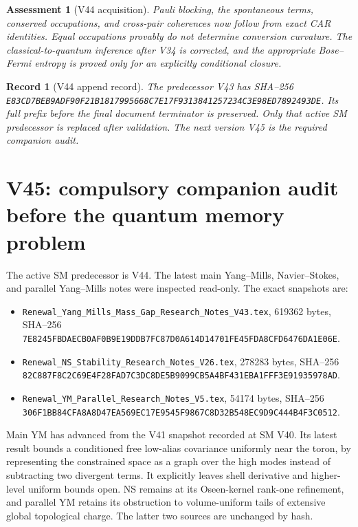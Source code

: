 \documentclass[11pt]{article}
\newtheorem{assessment}[theorem]{Assessment}
\newtheorem{record}[theorem]{Record}
\theoremstyle{remark}
\begin{document}
\begin{assessment}[V44 acquisition]
\label{ass:v20v44}
Pauli blocking, the spontaneous terms, conserved occupations, and
cross-pair coherences now follow from exact CAR identities.
Equal occupations provably do not determine conversion curvature.
The classical-to-quantum inference after V34 is corrected, and the
appropriate Bose--Fermi entropy is proved only for an explicitly
conditional closure.
\end{assessment}

\begin{record}[V44 append record]
\label{rec:v20v44}
The predecessor V43 has SHA--256
\texttt{E83CD7BEB9ADF90F21B1817995668C7E17F9313841257234C3E98ED7892493DE}.
Its full prefix before the final document terminator is preserved.
Only that active SM predecessor is replaced after validation.
The next version V45 is the required companion audit.
\end{record}



\section{V45: compulsory companion audit before the quantum memory problem}
\label{sec:v20v45}

The active SM predecessor is V44.  The latest main Yang--Mills,
Navier--Stokes, and parallel Yang--Mills notes were inspected read-only.
The exact snapshots are:
\begin{itemize}
\item \texttt{Renewal\_Yang\_Mills\_Mass\_Gap\_Research\_Notes\_V43.tex},
619362 bytes, SHA--256
\texttt{7E8245FBDAECB0AF0B9E19DDB7FC87D0A614D14701FE45FDA8CFD6476DA1E06E}.
\item \texttt{Renewal\_NS\_Stability\_Research\_Notes\_V26.tex},
278283 bytes, SHA--256
\texttt{82C887F8C2C69E4F28FAD7C3DC8DE5B9099CB5A4BF431EBA1FFF3E91935978AD}.
\item \texttt{Renewal\_YM\_Parallel\_Research\_Notes\_V5.tex},
54174 bytes, SHA--256
\texttt{306F1BB84CFA8A8D47EA569EC17E9545F9867C8D32B548EC9D9C444B4F3C0512}.
\end{itemize}

Main YM has advanced from the V41 snapshot recorded at SM V40.
Its latest result bounds a conditioned free low-alias covariance
uniformly near the toron, by representing the constrained space as a
graph over the high modes instead of subtracting two divergent terms.
It explicitly leaves shell derivative and higher-level uniform bounds
open.  NS remains at its Oseen-kernel rank-one refinement, and parallel
YM retains its obstruction to volume-uniform tails of extensive global
topological charge.  The latter two sources are unchanged by hash.
\end{document}
